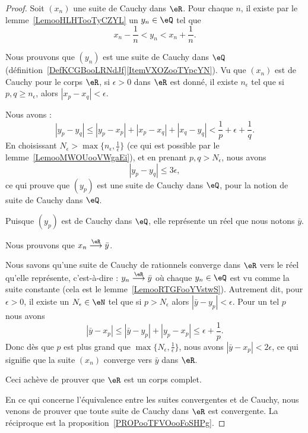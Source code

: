 \begin{proof}
	Soit \( (x_n)\) une suite de Cauchy dans \( \eR\). Pour chaque \( n\), il existe par le lemme~\ref{LemooHLHTooTyCZYL} un \( y_n\in \eQ\) tel que
	\begin{equation}
		x_n-\frac{1}{ n }<y_n<x_n+\frac{1}{ n }.
	\end{equation}
	\begin{subproof}
		Nous prouvons que \( (y_n)\) est une suite de Cauchy dans \( \eQ\) (définition~\ref{DefKCGBooLRNdJf}\ref{ItemVXOZooTYpcYN}). Vu que \( (x_n)\) est de Cauchy pour le corps \( \eR\), si \( \epsilon>0\) dans \( \eR\) est donné, il existe \( n_{\epsilon}\) tel que si \( p,q\geq n_{\epsilon}\), alors \( | x_p-x_q |<\epsilon\).

		Nous avons :
		\begin{equation}
			| y_p-y_q |\leq | y_p-x_p |+| x_p-x_q |+| x_q-y_q |<\frac{1}{ p }+\epsilon+\frac{1}{ q }.
		\end{equation}
		En choisissant \( N_{\epsilon}>\max\{ n_{\epsilon},\frac{1}{ \epsilon } \}\) (ce qui est possible par le lemme~\ref{LemooMWOUooVWgaEi}), et en prenant \( p,q>N_{\epsilon}\), nous avons
		\begin{equation}
			| y_p-y_q |\leq 3\epsilon,
		\end{equation}
		ce qui prouve que \( (y_p)\) est une suite de Cauchy dans \( \eQ\), pour la notion de suite de Cauchy dans \( \eQ\).


		Puisque \( (y_p)\) est de Cauchy dans \( \eQ\), elle représente un réel que nous notons \( \bar y\).

		\spitem[Convergence de \( (x_n)\)]

		Nous prouvons que \(     x_n\stackrel{\eR}{\longrightarrow}\bar y \).

		Nous savons qu'une suite de Cauchy de rationnels converge dans \( \eR\) vers le réel qu'elle représente, c'est-à-dire : \( y_n\stackrel{\eR}{\longrightarrow}\bar y\) où chaque \( y_n\in \eQ\) est vu comme la suite constante (cela est le lemme~\ref{LemooRTGFooYVstwS}). Autrement dit, pour \( \epsilon>0\), il existe un \( N_{\epsilon}\in \eN\) tel que si \( p>N_{\epsilon}\) alors \( | \bar y-y_p |<\epsilon\). Pour un tel \( p\) nous avons
		\begin{equation}
			| \bar y-x_p |\leq| \bar y-y_p |+| y_p-x_p |\leq \epsilon+\frac{1}{ p }.
		\end{equation}
		Donc dès que \( p\) est plus grand que \( \max\{ N_{\epsilon},\frac{1}{ \epsilon } \}\), nous avons \( | \bar y-x_p |<2\epsilon\), ce qui signifie que la suite \( (x_n) \) converge vers \( \bar y\) dans \( \eR\).

		Ceci achève de prouver que \( \eR\) est un corps complet.
	\end{subproof}

	En ce qui concerne l'équivalence entre les suites convergentes et de Cauchy, nous venons de prouver que toute suite de Cauchy dans \( \eR\) est convergente. La réciproque est la proposition~\ref{PROPooTFVOooFoSHPg}.

\end{proof}

